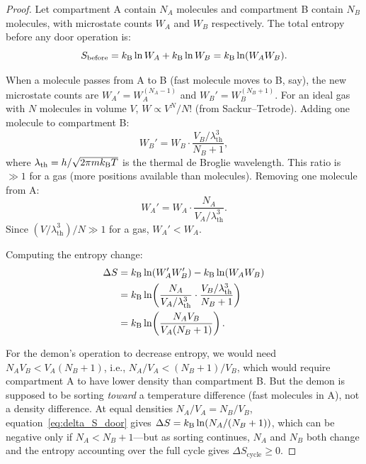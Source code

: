 \begin{proof}
Let compartment A contain $N_A$ molecules and compartment B contain $N_B$ molecules,
with microstate counts $W_A$ and $W_B$ respectively. The total entropy before
any door operation is:
\begin{equation}
  S_{\mathrm{before}} = k_{\mathrm{B}} \ln W_A + k_{\mathrm{B}} \ln W_B = k_{\mathrm{B}} \ln(W_A W_B).
\end{equation}

When a molecule passes from A to B (fast molecule moves to B, say), the new
microstate counts are $W_A' = W_{A}^{(N_A - 1)}$ and $W_B' = W_B^{(N_B + 1)}$.
For an ideal gas with $N$ molecules in volume $V$, $W \propto V^N / N!$
(from Sackur--Tetrode). Adding one molecule to compartment B:
\begin{equation}
  W_B' = W_B \cdot \frac{V_B / \lambda_{\mathrm{th}}^3}{N_B + 1},
\end{equation}
where $\lambda_{\mathrm{th}} = h / \sqrt{2\pi m k_{\mathrm{B}} T}$ is the thermal de Broglie
wavelength. This ratio is $\gg 1$ for a gas (more positions available than
molecules). Removing one molecule from A:
\begin{equation}
  W_A' = W_A \cdot \frac{N_A}{V_A / \lambda_{\mathrm{th}}^3}.
\end{equation}
Since $(V / \lambda_{\mathrm{th}}^3) / N \gg 1$ for a gas, $W_A' < W_A$.

Computing the entropy change:
\begin{align}
  \Delta S &= k_{\mathrm{B}} \ln(W_A' W_B') - k_{\mathrm{B}} \ln(W_A W_B) \notag \\
           &= k_{\mathrm{B}} \ln\!\left(\frac{N_A}{V_A/\lambda_{\mathrm{th}}^3} \cdot
              \frac{V_B/\lambda_{\mathrm{th}}^3}{N_B + 1}\right) \notag \\
           &= k_{\mathrm{B}} \ln\!\left(\frac{N_A V_B}{V_A (N_B + 1)}\right).
  \label{eq:delta_S_door}
\end{align}

For the demon's operation to decrease entropy, we would need $N_A V_B < V_A (N_B + 1)$,
i.e., $N_A / V_A < (N_B + 1)/V_B$, which would require compartment A to have
lower density than compartment B. But the demon is supposed to be sorting
\emph{toward} a temperature difference (fast molecules in A), not a density
difference. At equal densities $N_A/V_A = N_B/V_B$, equation~\eqref{eq:delta_S_door}
gives $\Delta S = k_{\mathrm{B}} \ln(N_A / (N_B + 1))$, which can be negative only if
$N_A < N_B + 1$---but as sorting continues, $N_A$ and $N_B$ both change and
the entropy accounting over the full cycle gives $\Delta S_{\mathrm{cycle}} \geq 0$.


\end{proof}
